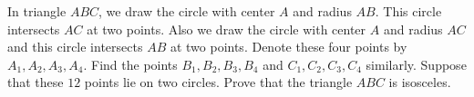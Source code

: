 In triangle $ABC$,  we draw the circle with center $A$ and radius $AB$. This circle intersects $AC$ at two points. Also we draw the circle with center $A$ and radius $AC$ and this circle intersects $AB$ at two points. Denote these four points by $A_1, A_2, A_3, A_4$. Find the points $B_1, B_2, B_3, B_4$ and $C_1, C_2, C_3, C_4$ similarly. Suppose that these $12$ points lie on two circles. Prove that the triangle $ABC$ is isosceles.
